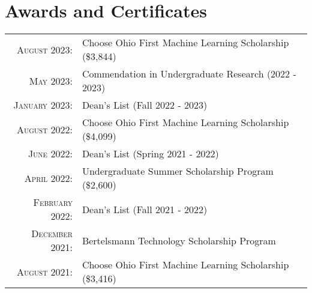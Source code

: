 \documentclass[letterpaper,8pt]{article} %
\begin{document}

\section{Awards and Certificates}

\footnotesize{\begin{tabular}{rl}
\textsc{August 2023}: & Choose Ohio First Machine Learning Scholarship \footnotesize(\$3,844)\normalsize\\
\textsc{May 2023}: & 
Commendation in Undergraduate Research (2022 - 2023)\\
\textsc{January 2023}: & Dean's List (Fall 2022 - 2023)\\
\textsc{August 2022}: & Choose Ohio First Machine Learning Scholarship \footnotesize(\$4,099)\normalsize\\
\textsc{June 2022}: & Dean's List (Spring 2021 - 2022)\\
\textsc{April 2022}: & Undergraduate Summer Scholarship Program \footnotesize(\$2,600)\\
\textsc{February 2022}: & Dean's List (Fall 2021 - 2022)\\
\textsc{December 2021}: & Bertelsmann Technology Scholarship Program\\
\textsc{August 2021}: & Choose Ohio First Machine Learning Scholarship \footnotesize(\$3,416)\normalsize\\
\end{tabular}}\normalsize
\end{document}
